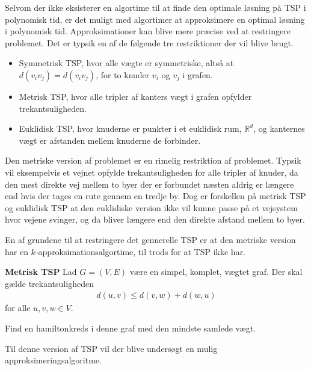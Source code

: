Selvom der ikke eksisterer en algortime til at finde den optimale løsning på TSP i polynomisk tid, er det muligt med algortimer at approksimere en optimal løsning i polynomisk tid. Approksimationer kan blive mere præcise ved at restringere problemet.
Det er typsik en af de følgende tre restriktioner der vil blive brugt. 
\begin{itemize}[noitemsep]
	\item Symmetrisk TSP, hvor alle vægte er symmetriske, altså at $d(v_i v_j) = d(v_i v_j)$, for to knuder $v_i$ og $v_j$ i grafen.
	\item Metrisk TSP, hvor alle tripler af kanters vægt i grafen opfylder trekantsuligheden.
	\item Euklidisk TSP, hvor knuderne er punkter i et euklidisk rum, ${\mathbb{R}}^d$, og kanternes vægt er afstanden mellem knuderne de forbinder.
\end{itemize}

Den metriske version af problemet er en rimelig restriktion af problemet.
Typsik vil eksempelvis et vejnet opfylde trekantsuligheden for alle tripler af knuder, da den mest direkte vej mellem to byer der er forbundet næsten aldrig er længere end hvis der tages en rute gennem en tredje by.
Dog er forskellen på metrisk TSP og euklidisk TSP at den euklidiske version ikke vil kunne passe på et vejsystem hvor vejene svinger, og da bliver længere end den direkte afstand mellem to byer.

En af grundene til at restringere det gennerelle TSP er at den metriske version har en $k$-approksimationsalgortime, til trods for at TSP ikke har.

\begin{tcolorbox}
	\textbf{Metrisk TSP} \quad Lad $G=(V,E)$ være en simpel, komplet, vægtet graf. Der skal gælde trekantsuligheden
	\begin{align*}
		d(u,v) \leq d(v,w) + d(w,u)
	\end{align*}
	for alle $u,v,w \in V$.

	Find en hamiltonkreds i denne graf med den mindste samlede vægt.
\end{tcolorbox}

Til denne version af TSP vil der blive undersøgt en mulig approksimeringsalgoritme.
